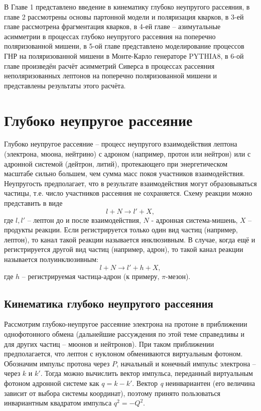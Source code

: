 \documentclass{extarticle}
\begin{document}
В Главе 1 представлено введение в кинематику глубоко неупругого рассеяния, в главе 2 рассмотрены основы партонной модели и поляризация кварков, в 3-ей главе рассмотрена фрагментация кварков,  в 4-ей главе -- азимутальные асимметрии в процессах глубоко неупругого рассеяния на поперечно поляризованной мишени, в 5-ой главе представлено моделирование процессов ГНР на поляризованной мишени в Монте-Карло генераторе PYTHIA8, в 6-ой главе произведён расчёт асимметрий Сиверса в процессах рассеяния неполяризованных лептонов на поперечно поляризованной мишени и представлены результаты этого расчёта.

\newpage
\section{Глубоко неупругое рассеяние}
Глубоко неупругое рассеяние – процесс неупругого взаимодействия лептона (электрона, мюона, нейтрино) с адроном (например, протон или нейтрон) или с адронной системой (дейтрон, литий), протекающего при энергетическом масштабе сильно большем, чем сумма масс покоя участников взаимодействия. Неупругость предполагает, что в результате взаимодействия могут образовываться частицы, т.е. число участников рассеяния не сохраняется. Схему реакции можно представить в виде
\begin{equation}
	l + N \rightarrow l' + X,
\end{equation}
где $l, l'$ -- лептон до и после взаимодействия, $N$ - адронная система-мишень, $X$ -- продукты реакции. Если регистрируется только один вид частиц (например, лептон), то канал такой реакции называется инклюзивным. В случае, когда ещё и регистрируется другой вид частиц (например, адрон), то такой канал реакции называется полуинклюзивным:
\begin{equation}
	l + N \rightarrow l' + h + X,
\end{equation}
где $h$ -- регистрируемая частица-адрон (к примеру, $\pi$-мезон). 
\subsection{Кинематика глубоко неупругого рассеяния}
Рассмотрим глубоко-неупругое рассеяние электрона на протоне в приближении однофотонного обмена (дальнейшие рассуждения по этой теме справедливы и для других частиц – мюонов и нейтронов). При таком приближении предполагается, что лептон с нуклоном обмениваются виртуальным фотоном. Обозначим импульс протона через $P$, начальный и конечный импульс электрона – через $k$ и $k'$. Тогда можно вычислить вектор импульса, переданный виртуальным фотоном адронной системе как $q=k-k'$. Вектор \textit{q} неинвариантен (его величина зависит от выбора системы координат), поэтому принято пользоваться инвариантным квадратом импульса $q^2=-Q^2$.
\end{document}

